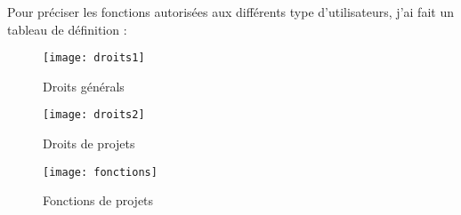 Pour préciser les fonctions autorisées aux différents type d’utilisateurs, j’ai fait un tableau de définition :
\begin{figure}[H]
\centering
\texttt{[image: droits1]}
\caption{Droits générals}
\texttt{[image: droits2]}
\caption{Droits de projets}
\end{figure}
\begin{figure}[H]
\centering
\texttt{[image: fonctions]}
\caption{Fonctions de projets}
\end{figure}